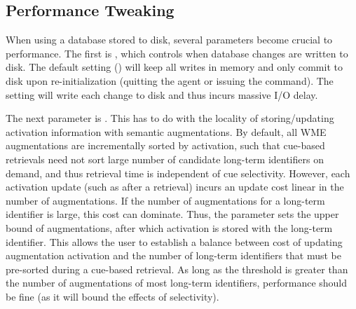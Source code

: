 \subsection{Performance Tweaking}

When using a database stored to disk, several parameters become crucial to performance.  
The first is , which controls when database changes are written to disk.   
The default setting () will keep all writes in memory and only commit to disk upon re-initialization (quitting the agent or issuing the  command).  
The  setting will write each change to disk and thus incurs massive I/O delay.

The next parameter is . 
This has to do with the locality of storing/updating activation information with semantic augmentations. 
By default, all WME augmentations are incrementally sorted by activation, such that cue-based retrievals need not sort large number of candidate long-term identifiers on demand, and thus retrieval time is independent of cue selectivity. 
However, each activation update (such as after a retrieval) incurs an update cost linear in the number of augmentations. 
If the number of augmentations for a long-term identifier is large, this cost can dominate. 
Thus, the  parameter sets the upper bound of augmentations, after which activation is stored with the long-term identifier. 
This allows the user to establish a balance between cost of updating augmentation activation and the number of long-term identifiers that must be pre-sorted during a cue-based retrieval. 
As long as the threshold is greater than the number of augmentations of most long-term identifiers, performance should be fine (as it will bound the effects of selectivity).

